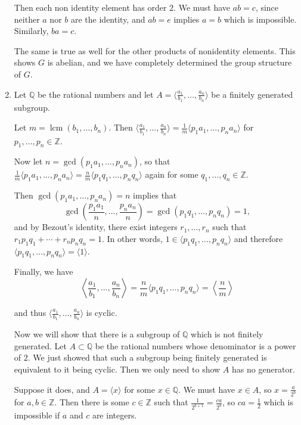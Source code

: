 \documentclass[11pt, reqno]{article}
\begin{document}
\begin{enumerate}
    Then each non identity element has order $2$. We must have $ab = c$, since neither $a$ nor $b$ are the identity,
    and $ab = e$ implies $a = b$ which is impossible. Similarly, $ba = c$. 

    The same is true as well for the other products of nonidentity elements. This shows $G$ is abelian, and 
    we have completely determined the group structure of $G$. 

    \item Let $\mathbb{Q}$ be the rational numbers and let $A = \langle \frac{a_1}{b_1}, \dots, \frac{a_n}{b_n}\rangle$
    be a finitely generated subgroup. 

    Let $m = \operatorname{lcm} (b_1, \dots, b_n)$.
    Then $\langle \frac{a_1}{b_1}, \dots, \frac{a_n}{b_n}\rangle = \frac{1}{m}\langle p_1 a_1, \dots, p_n a_n\rangle$
    for $p_1, \dots, p_n \in \mathbb{Z}$. 

    Now let $n = \gcd(p_1 a_1, \dots, p_n a_n)$, so that 
    $\frac{1}{m}\langle p_1 a_1, \dots, p_n a_n\rangle = \frac{n}{m}\langle p_1 q_1, \dots, p_n q_n\rangle$
    again for some $q_1, \dots, q_n \in \mathbb{Z}$. 

    Then $\gcd(p_1 a_1, \dots, p_n a_n) = n$ implies that 
    \[
    \gcd\left(\frac{p_1 a_1}{n}, \dots, \frac{p_n a_n}{n}\right) = \gcd\left(p_1 q_1, \dots, p_n q_n\right) = 1,
    \]
    and by Bezout's identity, there exist integers $r_1, \dots, r_n$ such that $r_1 p_1 q_1 + \cdots + r_n p_n q_n = 1$.
    In other words, $1 \in \langle p_1 q_1, \dots, p_n q_n \rangle$ and therefore $\langle p_1 q_1, \dots, p_n q_n\rangle = \langle 1 \rangle$.\

    Finally, we have
    \[
    \left\langle \frac{a_1}{b_1}, \dots, \frac{a_n}{b_n}\right\rangle = \frac{n}{m}\langle p_1 q_1, \dots, p_n q_n\rangle = 
    \left\langle \frac{n}{m}\right\rangle
    \]

    and thus $\langle \frac{a_1}{b_1}, \dots, \frac{a_n}{b_n}\rangle$ is cyclic.

    Now we will show that there is a subgroup of $\mathbb{Q}$ which is not finitely 
    generated. Let $A \subset \mathbb{Q}$ be the rational numbers whose denominator
    is a power of $2$. We just showed that such a subgroup being finitely generated is equivalent 
    to it being cyclic. Then we only need to show $A$ has no generator.

    Suppose it does, and $A = \langle x \rangle$ for some $x \in \mathbb{Q}$. We must have $x \in A$, 
    so $x = \frac{a}{2^b}$ for $a, b \in \mathbb{Z}$. Then there is some $c \in \mathbb{Z}$ such that 
    $\frac{1}{2^{b + 1}} = \frac{ca}{2^{b}}$, so $ca = \frac{1}{2}$ which is impossible if $a$ and $c$ are
    integers. 


\end{enumerate}
\end{document}
